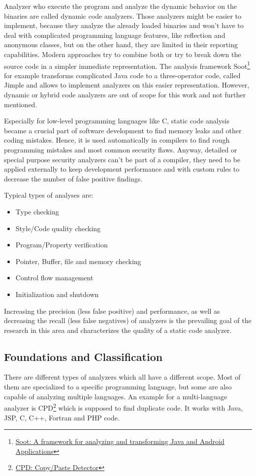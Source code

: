 \documentclass[conference]{IEEEtran}
\begin{document}
Analyzer who execute the program and analyze the dynamic behavior on the binaries are called dynamic code analyzers.
Those analyzers might be easier to implement, because they analyze the already loaded binaries and won't have to deal with complicated programming language features, like reflection and anonymous classes, but on the other hand, they are limited in their reporting capabilities.
Modern approaches try to combine both or try to break down the source code in a simpler immediate representation.
The analysis framework Soot\footnote{\href{https://sable.github.io/soot/}{Soot: A framework for analyzing and transforming Java and Android Applications}} for example transforms complicated Java code to a three-operator code, called Jimple and allows to implement analyzers on this easier representation.
However, dynamic or hybrid code analyzers are out of scope for this work and not further mentioned.


Especially for low-level programming languages like C, static code analysis became a crucial part of software development to find memory leaks and other coding mistakes.
Hence, it is used automatically in compilers to find rough programming mistakes and most common security flaws.
Anyway, detailed or special purpose security analyzers can't be part of a compiler, they need to be applied externally to keep development performance and with custom rules to decrease the number of false positive findings.

Typical types of analyses are:
\begin{itemize}
	\item Type checking
	\item Style/Code quality checking
	\item Program/Property verification
	\item Pointer, Buffer, file and memory checking
	\item Control flow management
	\item Initialization and shutdown
\end{itemize}

Increasing the precision (less false positive) and performance, as well as decreasing the recall (less false negatives) of analyzers is the prevailing goal of the research in this area and characterizes the quality of a static code analyzer.


\subsection{Foundations and Classification}
\label{subsec:static_code_analysis_foundations}
There are different types of analyzers which all have a different scope. Most of them are specialized to a specific programming language, but some are also capable of analyzing multiple languages. An example for a multi-language analyzer is CPD\footnote{\href{http://pmd.sourceforge.net/pmd-4.3.0/cpd.html}{CPD: Copy/Paste Detector}} which is supposed to find duplicate code. It works with Java, JSP, C, C++, Fortran and PHP code.
\end{document}

